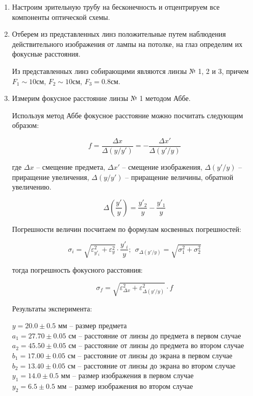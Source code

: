 	\begin{enumerate}
		\item Настроим зрительную трубу на бесконечность и отцентрируем все компоненты оптической схемы.
		\item Отберем из представленных линз положительные путем наблюдения действительного изображения от лампы на потолке, на глаз определим их фокусные расстояния.
		
		Из представленных линз собирающими являются линзы № 1, 2 и 3, причем $F_1 \sim 10 \text{см}$, $F_2 \sim 10 \text{см}$, $F_3 = 0.8 \text{см}$.
		
		\item Измерим фокусное расстояние линзы № 1 методом Аббе.
		
		Используя метод Аббе фокусное расстояние можно посчитать следующим образом:
		
		\begin{equation}
			f = \frac{\Delta x}{\Delta (y/y')} = - \frac{\Delta x'}{\Delta (y'/y)}
		\end{equation}
		
		где $\Delta x$ -- смещение предмета, $\Delta x'$ -- смещение изображения, $\Delta (y'/y)$ -- приращение увеличения, $\Delta (y/y')$ -- приращение величины, обратной увеличению.
		
		\begin{equation}
			\Delta \left( \frac{y'}{y} \right) = \frac{y'_2}{y} - \frac{y'_1}{y}
		\end{equation} 
		
		Погрешности величин посчитаем по формулам косвенных погрешностей:
		
		\begin{equation}
			\sigma_i = \sqrt{\varepsilon_{y'_i}^2 + \varepsilon_{y}^2} \cdot \frac{y'_i}{y}; ~~ \sigma_{\Delta (y'/y)} = \sqrt{\sigma_1^2 + \sigma_2^2}
		\end{equation}
		
		тогда погрешность фокусного расстояния:
		
		\begin{equation}
			\sigma_f = \sqrt{\varepsilon_{\Delta x}^2 + \varepsilon_{\Delta (y'/y)}^2} \cdot f
		\end{equation}
		
		Результаты эксперимента:
		
		\begin{center}
			$y = 20.0 \pm 0.5$ мм -- размер предмета \\
			$a_1 = 27.70 \pm 0.05$ см -- расстояние от линзы до предмета в первом случае \\
			$a_2 = 45.50 \pm 0.05$ см -- расстояние от линзы до предмета во  втором случае \\
			$b_1 = 17.00 \pm 0.05$ см -- расстояние от линзы до экрана в первом случае \\
			$b_2 = 13.40 \pm 0.05$ см -- расстояние от линзы до экрана во втором случае \\
			$y_1 = 14.0 \pm 0.5$ мм -- размер изображения в первом случае \\
			$y_2 = 6.5 \pm 0.5$ мм -- размер изображения во втором случае \\
		\end{center}
	

\end{enumerate}
